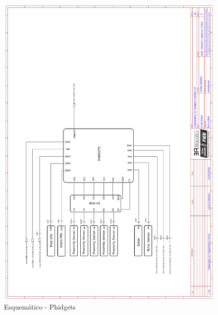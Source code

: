     \begin{figure}[H]
	\centering
	\includegraphics[width=14cm]{Figures/EsquematicoPHIDGETS.png}
	\caption{Esquemático - Phidgets} \label{Phidgets}
	\end{figure}
	
    \pagebreak
    
